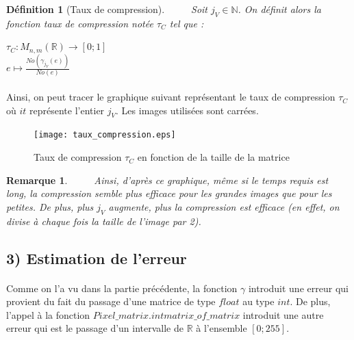 \documentclass[a4paper,10pt]{report}
\theoremstyle{break}
\newtheorem{Def}{D\'{e}finition}
\newtheorem{Rem}{Remarque}
\begin{document}
    \begin{Def}[Taux de compression]
      $\phantom{Prop}$ Soit $j_V \in \mathbb{N}$. On d\'{e}finit alors la fonction taux de compression not\'{e}e $\tau_C$ tel que :
      
      \begin{center}
	$ \tau_C :  M_{n,m}(\mathbb{R}) \longrightarrow [0;1] $ \\
	$ e \longmapsto \frac{No(\gamma_{j_V}(e))}{No(e)} $
      \end{center}

    \end{Def}
    
\newpage
    
    \paragraph{} Ainsi, on peut tracer le graphique suivant repr\'{e}sentant le taux de compression $\tau_C$ 
	o\`{u} $it$ repr\'{e}sente l'entier $j_V$. Les images utilis\'{e}es sont carr\'{e}es.

    \begin{figure}[!h]
	\centering
	\texttt{[image: taux\_compression.eps]}
	\caption{Taux de compression $\tau_C$ en fonction de la taille de la matrice}
    \end{figure}
    
    \begin{Rem}
      $\phantom{Prop}$ Ainsi, d'apr\`{e}s ce graphique, m\^{e}me si le temps requis est long, la compression semble plus efficace 
	pour les grandes images que pour les petites. De plus, plus $j_V$ augmente, plus la compression est efficace (en effet,
	on divise \`{a} chaque fois la taille de l'image par 2).
    \end{Rem}

    
  \subsection*{3) Estimation de l'erreur}
  
    \paragraph{} Comme on l'a vu dans la partie pr\'{e}c\'{e}dente, la fonction $\gamma$ introduit une erreur qui provient du fait 
	du passage d'une matrice de type $float$ au type $int$. De plus, l'appel \`{a} la fonction $Pixel\_matrix.intmatrix\_of\_matrix$
	introduit une autre erreur qui est le passage d'un intervalle de $\mathbb{R}$ \`{a} l'ensemble $[0;255]$.
	
\end{document}
